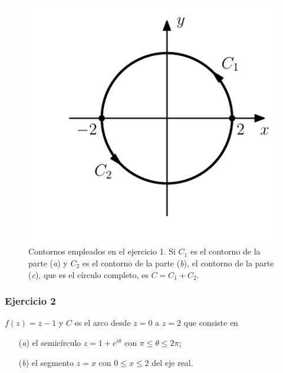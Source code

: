 \documentclass[a4paper]{report}
\begin{document}
\begin{itemize}
\begin{figure}[!htb]
\begin{minipage}[c]{0.35\textwidth}
    \includegraphics[width=\textwidth]{figuras/exercise_46_01.pdf}
  \end{minipage}\hfill
  \begin{minipage}[c]{0.55\textwidth}
    \caption{
        Contornos empleados en el ejercicio 1. Si \(C_1\) es el contorno de la parte (\textit{a}) y \(C_2\) es el contorno de la parte (\textit{b}), el contorno de la parte (\textit{c}), que es el círculo completo, es \(C=C_1+C_2\).
    }\label{fig:exercise_46_01}
  \end{minipage}
\end{figure}
\end{itemize}

\subsubsection{Ejercicio 2}

\(f(z)=z-1\) y \(C\) es el arco desde \(z=0\) a \(z=2\) que consiste en
\begin{itemize}
 \item[(\textit{a})] el semicírculo \(z=1+e^{i\theta}\) con \(\pi\leq\theta\leq2\pi\);
 \item[(\textit{b})] el segmento \(z=x\) con \(0\leq x\leq2\) del eje real.
\end{itemize}
\end{document}
